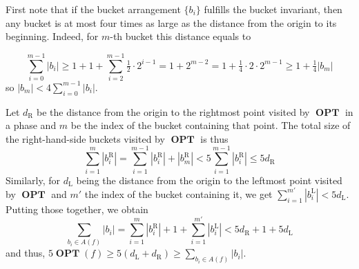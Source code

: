 \documentclass[a4paper]{article}
\DeclareMathOperator \Opt {\textbf{OPT}}
\newcommand \opt {\ensuremath{\Opt}}
\begin{document}
First note that if the bucket arrangement $\{b_i\}$ fulfills the bucket 
invariant, then any bucket is at most four times as large as the distance from 
the origin to its beginning. Indeed, for $m$-th bucket this distance equals to

\[ \sum_{i=0}^{m-1}|b_i| \geq 1+1+\sum_{i=2}^{m-1}\tfrac12\cdot2^{i-1}
                            = 1+2^{m-2} = 1+\tfrac14\cdot2\cdot2^{m-1}
                         \geq 1+\tfrac14|b_m| \]
so $|b_m|<4\sum_{i=0}^{m-1}|b_i|$.

Let $d_\text{R}$ be the distance from the origin to the rightmost point visited 
by \opt{} in a phase and $m$ be the index of the bucket containing that point. 
The total size of the right-hand-side buckets visited by \opt{} is thus
\[ \sum_{i=1}^m|b_i^\text{R}| = \sum_{i=1}^{m-1}|b_i^\text{R}|+|b_m^\text{R}|
                              < 5\sum_{i=1}^{m-1}|b_i^\text{R}|
                           \leq 5d_\text{R} \]
Similarly, for $d_\text{L}$ being the distance from the origin to the leftmost 
point visited by \opt{} and $m'$ the index of the bucket containing it, we get 
$\sum_{i=1}^{m'}|b_i^\text{L}| < 5d_\text{L}$. Putting those together, we obtain
\[ \sum_{b_i\in A(f)}|b_i| = \sum_{i=1}^{m}|b_i^\text{R}| + 1
                           + \sum_{i=1}^{m'}|b_i^\text{L}|
                           < 5d_\text{R} + 1 + 5d_\text{L} \]
and thus, $5\opt{}(f)\geq5(d_\text{L}+d_\text{R})\geq\sum_{b_i\in A(f)}|b_i|$.

\thispagestyle{empty}
\end{document}
